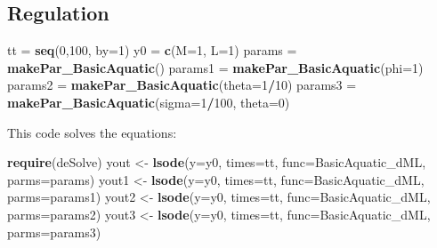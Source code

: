 \documentclass[
]{book}
\newenvironment{Shaded}{\begin{snugshade}}{\end{snugshade}}
\newcommand{\AttributeTok}[1]{\textcolor[rgb]{0.13,0.29,0.53}{#1}}
\newcommand{\DecValTok}[1]{\textcolor[rgb]{0.00,0.00,0.81}{#1}}
\newcommand{\FunctionTok}[1]{\textcolor[rgb]{0.13,0.29,0.53}{\textbf{#1}}}
\newcommand{\NormalTok}[1]{#1}
\newcommand{\OtherTok}[1]{\textcolor[rgb]{0.56,0.35,0.01}{#1}}
\newcommand{\SpecialCharTok}[1]{\textcolor[rgb]{0.81,0.36,0.00}{\textbf{#1}}}
\begin{document}
\hypertarget{regulation}{%
\subsection{Regulation}\label{regulation}}

\begin{Shaded}
\begin{Highlighting}[]
\NormalTok{tt }\OtherTok{=} \FunctionTok{seq}\NormalTok{(}\DecValTok{0}\NormalTok{,}\DecValTok{100}\NormalTok{, }\AttributeTok{by=}\DecValTok{1}\NormalTok{) }
\NormalTok{y0 }\OtherTok{=} \FunctionTok{c}\NormalTok{(}\AttributeTok{M=}\DecValTok{1}\NormalTok{, }\AttributeTok{L=}\DecValTok{1}\NormalTok{)}
\NormalTok{params }\OtherTok{=} \FunctionTok{makePar\_BasicAquatic}\NormalTok{()}
\NormalTok{params1 }\OtherTok{=} \FunctionTok{makePar\_BasicAquatic}\NormalTok{(}\AttributeTok{phi=}\DecValTok{1}\NormalTok{)}
\NormalTok{params2 }\OtherTok{=} \FunctionTok{makePar\_BasicAquatic}\NormalTok{(}\AttributeTok{theta=}\DecValTok{1}\SpecialCharTok{/}\DecValTok{10}\NormalTok{)}
\NormalTok{params3 }\OtherTok{=} \FunctionTok{makePar\_BasicAquatic}\NormalTok{(}\AttributeTok{sigma=}\DecValTok{1}\SpecialCharTok{/}\DecValTok{100}\NormalTok{, }\AttributeTok{theta=}\DecValTok{0}\NormalTok{)}
\end{Highlighting}
\end{Shaded}

This code solves the equations:

\begin{Shaded}
\begin{Highlighting}[]
\FunctionTok{require}\NormalTok{(deSolve)}
\NormalTok{yout  }\OtherTok{\textless{}{-}} \FunctionTok{lsode}\NormalTok{(}\AttributeTok{y=}\NormalTok{y0, }\AttributeTok{times=}\NormalTok{tt, }\AttributeTok{func=}\NormalTok{BasicAquatic\_dML, }\AttributeTok{parms=}\NormalTok{params) }
\NormalTok{yout1 }\OtherTok{\textless{}{-}} \FunctionTok{lsode}\NormalTok{(}\AttributeTok{y=}\NormalTok{y0, }\AttributeTok{times=}\NormalTok{tt, }\AttributeTok{func=}\NormalTok{BasicAquatic\_dML, }\AttributeTok{parms=}\NormalTok{params1) }
\NormalTok{yout2 }\OtherTok{\textless{}{-}} \FunctionTok{lsode}\NormalTok{(}\AttributeTok{y=}\NormalTok{y0, }\AttributeTok{times=}\NormalTok{tt, }\AttributeTok{func=}\NormalTok{BasicAquatic\_dML, }\AttributeTok{parms=}\NormalTok{params2) }
\NormalTok{yout3 }\OtherTok{\textless{}{-}} \FunctionTok{lsode}\NormalTok{(}\AttributeTok{y=}\NormalTok{y0, }\AttributeTok{times=}\NormalTok{tt, }\AttributeTok{func=}\NormalTok{BasicAquatic\_dML, }\AttributeTok{parms=}\NormalTok{params3) }
\end{Highlighting}
\end{Shaded}
\end{document}
